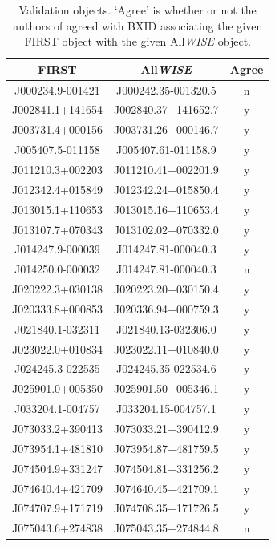   \begin{table}
    \caption[Validation objects.]{\label{tab:verification-set} Validation objects. `Agree' is whether or not the authors of \citet{alger21rlfs} agreed with BXID associating the given FIRST object with the given All\emph{WISE} object.}
        \scriptsize\centering
      \begin{tabular}{ccc}
        \hline\hline
        FIRST & All\emph{WISE} & Agree\\\hline
        J000234.9-001421 & J000242.35-001320.5 & n\\
        J002841.1+141654 & J002840.37+141652.7 & y\\
        J003731.4+000156 & J003731.26+000146.7 & y\\
        J005407.5-011158 & J005407.61-011158.9 & y\\
        J011210.3+002203 & J011210.41+002201.9 & y\\
        J012342.4+015849 & J012342.24+015850.4 & y\\
        J013015.1+110653 & J013015.16+110653.4 & y\\
        J013107.7+070343 & J013102.02+070332.0 & y\\
        J014247.9-000039 & J014247.81-000040.3 & y\\
        J014250.0-000032 & J014247.81-000040.3 & n\\
        J020222.3+030138 & J020223.20+030150.4 & y\\
        J020333.8+000853 & J020336.94+000759.3 & y\\
        J021840.1-032311 & J021840.13-032306.0 & y\\
        J023022.0+010834 & J023022.11+010840.0 & y\\
        J024245.3-022535 & J024245.35-022534.6 & y\\
        J025901.0+005350 & J025901.50+005346.1 & y\\
        J033204.1-004757 & J033204.15-004757.1 & y\\
        J073033.2+390413 & J073033.21+390412.9 & y\\
        J073954.1+481810 & J073954.87+481759.5 & y\\
        J074504.9+331247 & J074504.81+331256.2 & y\\
        J074640.4+421709 & J074640.45+421709.1 & y\\
        J074707.9+171719 & J074708.35+171726.5 & y\\
        J075043.6+274838 & J075043.35+274844.8 & n\\

\end{tabular}
\end{table}
